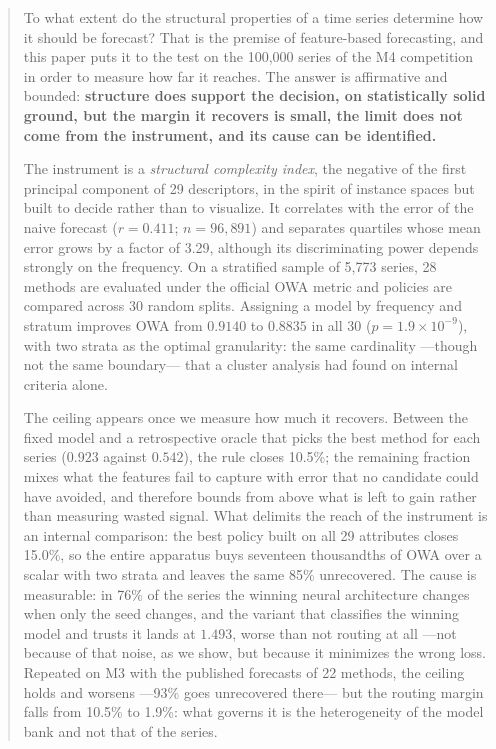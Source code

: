 \maketitle

\begin{abstract}
\noindent
To what extent do the structural properties of a time series determine how it should be
forecast? That is the premise of feature-based forecasting, and this paper puts it to the
test on the 100{,}000 series of the M4 competition in order to measure how far it reaches.
The answer is affirmative and bounded: \textbf{structure does support the decision, on
statistically solid ground, but the margin it recovers is small, the limit does not come
from the instrument, and its cause can be identified.}

The instrument is a \emph{structural complexity index}, the negative of the first
principal component of 29 descriptors, in the spirit of instance spaces \cite{kang2017}
but built to decide rather than to visualize. It correlates with the error of the naive
forecast ($r=0.411$; $n=96{,}891$) and separates quartiles whose mean error grows by a
factor of 3.29, although its discriminating power depends strongly on the frequency. On a
stratified sample of 5{,}773 series, 28 methods are evaluated under the official OWA
metric and policies are compared across 30 random splits. Assigning a model by frequency
and stratum improves OWA from $0.9140$ to $0.8835$ in all 30 ($p=1.9\times10^{-9}$), with
two strata as the optimal granularity: the same cardinality ---though not the same
boundary--- that a cluster analysis had found on internal criteria alone.

The ceiling appears once we measure how much it recovers. Between the fixed model and a
retrospective oracle that picks the best method for each series ($0.923$ against $0.542$),
the rule closes 10.5\%; the remaining fraction mixes what the features fail to capture
with error that no candidate could have avoided, and therefore bounds from above what is
left to gain rather than measuring wasted signal. What delimits the reach of the
instrument is an internal comparison: the best policy built on all 29 attributes closes
15.0\%, so the entire apparatus buys seventeen thousandths of OWA over a scalar with two
strata and leaves the same 85\% unrecovered. The cause is measurable: in 76\% of the
series the winning neural architecture changes when only the seed changes, and the variant
that classifies the winning model and trusts it lands at $1.493$, worse than not routing
at all ---not because of that noise, as we show, but because it minimizes the wrong loss.
Repeated on M3 with the published forecasts of 22 methods, the ceiling holds and worsens
---93\% goes unrecovered there--- but the routing margin falls from 10.5\% to 1.9\%: what
governs it is the heterogeneity of the model bank and not that of the series.


\end{abstract}
